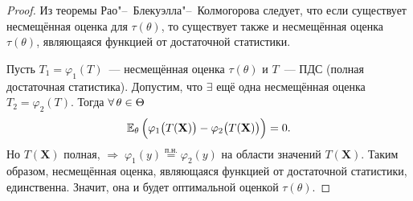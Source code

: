\begin{proof}
    Из теоремы Рао"--~Блекуэлла"--~Колмогорова следует, что если существует несмещённая оценка для $\tau(\theta)$, 
    то существует также и несмещённая оценка $\tau(\theta)$, являющаяся функцией от достаточной статистики.

    Пусть $T_1 = \varphi_1(T)$~--- несмещённая оценка $\tau(\theta)$ и $T$~--- ПДС (полная достаточная статистика).
    Допустим, что $\exists$ ещё одна несмещённая оценка $T_2 = \varphi_2(T)$.
    Тогда $\forall \, \theta \in \Theta$
    \begin{equation*}
        \mathbb{E}_{\theta}\, \Bigl(\varphi_1\bigl(T(\mathbf{X})\bigr) - \varphi_2\bigl(T(\mathbf{X})\bigr) \Bigr) = 0.
    \end{equation*}
    Но $T(\mathbf{X})$ полная, $\Rightarrow \; \varphi_1(y) \overset{\text{п.н.}}{=} \varphi_2(y)$ на области значений $T(\mathbf{X})$.
    Таким образом, несмещённая оценка, являющаяся функцией от достаточной статистики, единственна.
    Значит, она и будет оптимальной оценкой $\tau(\theta)$.

\end{proof}
